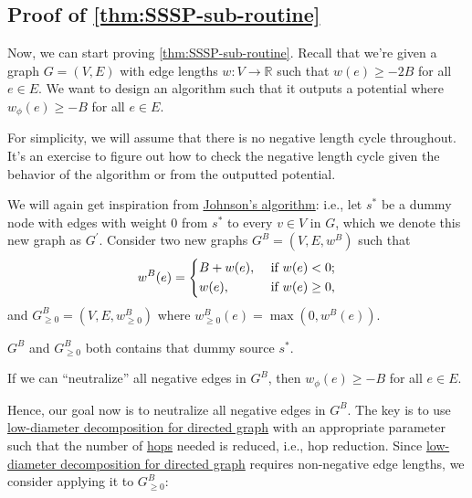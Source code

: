 \subsection{Proof of \autoref{thm:SSSP-sub-routine}}
Now, we can start proving \autoref{thm:SSSP-sub-routine}. Recall that we're given a graph \(G = (V, E)\) with edge lengths \(w \colon V \to \mathbb{R} \) such that \(w(e) \geq -2B\) for all \(e \in E\). We want to design an algorithm such that it outputs a potential where \(w_{\phi } (e) \geq -B\) for all \(e \in E\).

\begin{note}
	For simplicity, we will assume that there is no negative length cycle throughout. It's an exercise to figure out how to check the negative length cycle given the behavior of the algorithm or from the outputted potential.
\end{note}

We will again get inspiration from \hyperref[prev:Johnson-algorithm]{Johnson's algorithm}: i.e., let \(s^{\ast} \) be a dummy node with edges with weight \(0\) from \(s^{\ast} \) to every \(v \in V\) in \(G\), which we denote this new graph as \(G^{\prime} \). Consider two new graphs \(G^B = (V, E, w^B)\) such that
\[
	w^B (e)
	= \begin{dcases}
		B + w(e), & \text{ if } w(e) < 0 ;    \\
		w(e),     & \text{ if } w(e) \geq 0 ,
	\end{dcases}
\]
and \(G^B_{\geq 0} = (V, E, w^B_{\geq 0})\) where \(w^B_{\geq 0} (e) = \max (0, w^B(e))\).

\begin{note}
	\(G^B\) and \(G^B_{\geq 0}\) both contains that dummy source \(s^{\ast} \).
\end{note}

\begin{remark}
	If we can ``neutralize'' all negative edges in \(G^B\), then \(w_{\phi } (e) \geq -B\) for all \(e \in E\).
\end{remark}

Hence, our goal now is to neutralize all negative edges in \(G^B\). The key is to use \hyperref[thm:directed-LDD]{low-diameter decomposition for directed graph} with an appropriate parameter such that the number of \hyperref[not:hop]{hops} needed is reduced, i.e., hop reduction. Since \hyperref[thm:directed-LDD]{low-diameter decomposition for directed graph} requires non-negative edge lengths, we consider applying it to \(G_{\geq 0}^B\):

